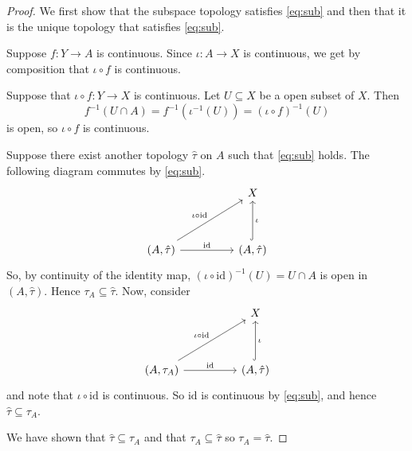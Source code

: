 \begin{proof}
  We first show that the subspace topology satisfies 
  \eqref{eq:sub} and then that it is the unique topology that
  satisfies \eqref{eq:sub}.

  Suppose \( f: Y \to A \) is continuous.
  Since \( \iota: A \to X \) is continuous, we get by
  composition that \( \iota \circ f \) is continuous.

  Suppose that \( \iota \circ f: Y \to X \) is continuous.
  Let \( U \subseteq X \) be a open subset of \( X \).
  Then 
  \[
    {f}^{-1} (U\cap A) = {f}^{-1}( {\iota}^{-1} (U))
    = {(\iota \circ f)}^{-1} (U)
  \]
  is open, so \( \iota \circ f \) is continuous.

  Suppose there exist another topology
  \( \hat{\tau} \) on \( A \) such that
  \eqref{eq:sub} holds. The following diagram commutes
  by \eqref{eq:sub}.
\[\begin{tikzcd}
	&& X \\
	\\
	{(A, \hat{\tau})} && {(A, \hat{\tau})}
	\arrow["{ \iota \circ \text{id}}", from=3-1, to=1-3]
	\arrow["{\text{id}}", from=3-1, to=3-3]
	\arrow["\iota"', hook, from=3-3, to=1-3]
\end{tikzcd}\]
So, by continuity of the identity map,
\( {(\iota \circ \text{id})}^{-1} (U) = U \cap A \) is open in \( (A, \hat{\tau}) \). Hence \( \tau_A \subseteq  \hat{\tau} \).
Now, consider
\[\begin{tikzcd}
	&& X \\
	\\
	{(A, \tau_A)} && {(A, \hat{\tau})}
	\arrow["{\iota \circ \text{id}}", from=3-1, to=1-3]
	\arrow["{\text{id}}", from=3-1, to=3-3]
	\arrow["\iota"', hook, from=3-3, to=1-3]
\end{tikzcd}\]
and note that \( \iota \circ \text{id}\) is continuous.
So \( \text{id} \) is continuous by \eqref{eq:sub},
and hence \( \hat{\tau} \subseteq \tau_A \).

We have shown that \( \hat{\tau} \subseteq \tau_A \)
and that \( \tau_A \subseteq  \hat{\tau} \) so \( \tau_A = \hat{\tau} \).
\end{proof}

